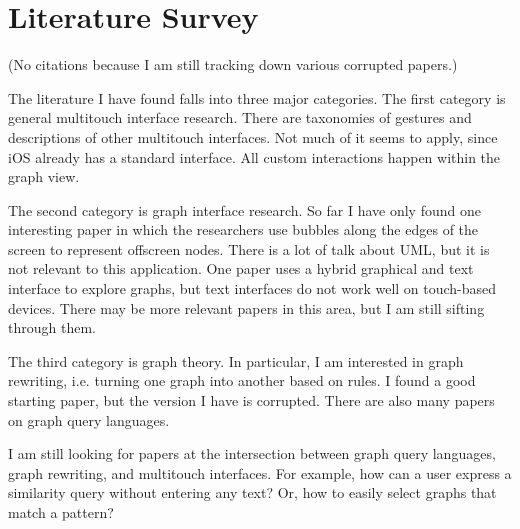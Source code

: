 \section{Literature Survey}

(No citations because I am still tracking down various corrupted papers.)

The literature I have found falls into three major categories. The first category is general multitouch interface research. There are taxonomies of gestures \cite{multitouch:gestures} and descriptions of other multitouch interfaces. Not much of it seems to apply, since iOS already has a standard interface. All custom interactions happen within the graph view.

The second category is graph interface research. So far I have only found one interesting paper in which the researchers use bubbles along the edges of the screen to represent offscreen nodes. There is a lot of talk about UML, but it is not relevant to this application. One paper uses a hybrid graphical and text interface to explore graphs, but text interfaces do not work well on touch-based devices. There may be more relevant papers in this area, but I am still sifting through them.

The third category is graph theory. In particular, I am interested in graph rewriting, i.e. turning one graph into another based on rules. I found a good starting paper, but the version I have is corrupted. There are also many papers on graph query languages.

I am still looking for papers at the intersection between graph query languages, graph rewriting, and multitouch interfaces. For example, how can a user express a similarity query without entering any text? Or, how to easily select graphs that match a pattern?
